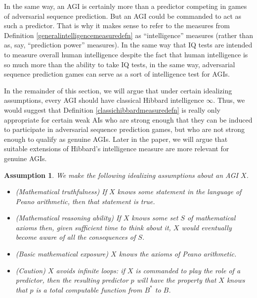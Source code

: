 \documentclass{article}
\newtheorem{assumption}[theorem]{Assumption}
\begin{document}
In the same way, an AGI is certainly more than a predictor competing in
games of adversarial sequence prediction. But an AGI could be commanded to
act as such a predictor. That is why it makes sense to refer to the measures
from Definition \ref{generalintelligencemeasuredefn} as ``intelligence'' measures
(rather than as, say, ``prediction power'' measures). In the same way that
IQ tests are intended to measure overall human intelligence despite the fact that
human intelligence is so much more than the ability to take IQ tests, in the same
way, adversarial sequence prediction games can serve as a sort of intelligence
test for AGIs.

In the remainder of this section, we will argue that under certain idealizing
assumptions, every AGI should have classical Hibbard intelligence $\infty$.
Thus, we would suggest that Definition \ref{classichibbardmeasuredefn} is really
only appropriate for certain weak AIs who are strong enough that they can be
induced to participate in adversarial sequence prediction games, but who are
not strong enough to qualify as genuine AGIs. Later in the paper, we will argue
that suitable extensions of Hibbard's intelligence measure are more relevant
for genuine AGIs.

\begin{assumption}
\label{idealizingassumption}
    We make the following idealizing assumptions about an AGI $X$.
    \begin{itemize}
        \item
        (Mathematical truthfulness) If $X$ knows some statement in the language
        of Peano arithmetic, then that statement is true.
        \item
        (Mathematical reasoning ability) If $X$ knows some set $S$ of mathematical
        axioms then, given sufficient time to think about it, $X$ would eventually
        become aware of all the consequences of $S$.
        \item
        (Basic mathematical exposure) $X$ knows the axioms of Peano arithmetic.
        \item
        (Caution) $X$ avoids infinite loops: if $X$ is commanded to play the
        role of a predictor, then the resulting predictor $p$ will have
        the property that $X$ knows that $p$ is a total computable function
        from $B^*$ to $B$.
    \end{itemize}
\end{assumption}
\end{document}
